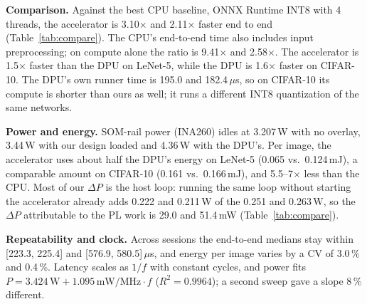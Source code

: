 \textbf{Comparison.} Against the best CPU baseline, ONNX Runtime INT8 with
4 threads, the accelerator is 3.10$\times$ and 2.11$\times$ faster end to end
(Table~\ref{tab:compare}). The CPU's end-to-end time also includes input
preprocessing; on compute alone the ratio is 9.41$\times$ and 2.58$\times$.
The accelerator is 1.5$\times$ faster than the DPU on LeNet-5, while the DPU
is 1.6$\times$ faster on CIFAR-10. The DPU's own runner time is 195.0 and
182.4\,$\mu$s, so on CIFAR-10 its compute is shorter than ours as well; it
runs a different INT8 quantization of the same networks.

\textbf{Power and energy.} SOM-rail power (INA260) idles at 3.207\,W with
no overlay, 3.44\,W with our design loaded and 4.36\,W with the DPU's.
Per image, the accelerator uses about half the DPU's energy on LeNet-5
(0.065 vs.\ 0.124\,mJ), a comparable amount on CIFAR-10 (0.161 vs.\
0.166\,mJ), and 5.5--7$\times$ less than the CPU.
Most of our $\Delta P$ is the host loop: running the same loop without
starting the accelerator already adds 0.222 and 0.211\,W of the 0.251 and
0.263\,W, so the $\Delta P$ attributable to the PL work is 29.0 and
51.4\,mW (Table~\ref{tab:compare}). %

\textbf{Repeatability and clock.} Across sessions the end-to-end medians stay
within [223.3, 225.4] and [576.9, 580.5]\,$\mu$s, and energy per image varies
by a CV of 3.0\,\% and 0.4\,\%. Latency scales as $1/f$ with constant cycles,
and power fits $P = 3.424\,\mathrm{W} + 1.095\,\mathrm{mW/MHz} \cdot f$
($R^2 = 0.9964$); a second sweep gave a slope 8\,\% different.

